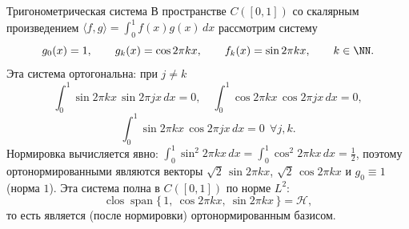 \begin{Example}{Тригонометрическая система}{}
	В пространстве $C([0,1])$ со скалярным произведением $\langle f, g\rangle = \int_0^1 f(x)g(x)\,dx$ рассмотрим систему
	\[
	g_0(x) = 1, \qquad g_k(x) = \cos 2\pi k x, \qquad f_k(x) = \sin 2\pi k x, \qquad k \in \NN.
	\]
	Эта система ортогональна: при $j \neq k$
	\[
	\int_0^1 \sin 2\pi k x \,\sin 2\pi j x\,dx = 0, \quad
	\int_0^1 \cos 2\pi k x \,\cos 2\pi j x\,dx = 0, 
	\]
	\[
	\int_0^1 \sin 2\pi k x \,\cos 2\pi j x\,dx = 0 \ \ \forall j,k.
	\]
	Нормировка вычисляется явно: $\int_0^1 \sin^2 2\pi k x\,dx = \int_0^1 \cos^2 2\pi k x\,dx = \tfrac12$, поэтому ортонормированными являются векторы $\sqrt{2}\,\sin 2\pi k x$, $\sqrt{2}\,\cos 2\pi k x$ и $g_0 \equiv 1$ (норма $1$). Эта система полна в $C([0,1])$ по норме $L^2$:
	\[
	\operatorname{clos}\operatorname{span}\{\,1,\ \cos 2\pi k x,\ \sin 2\pi k x \,\} = \mathcal{H},
	\]
	то есть является (после нормировки) ортонормированным базисом.
\end{Example}
